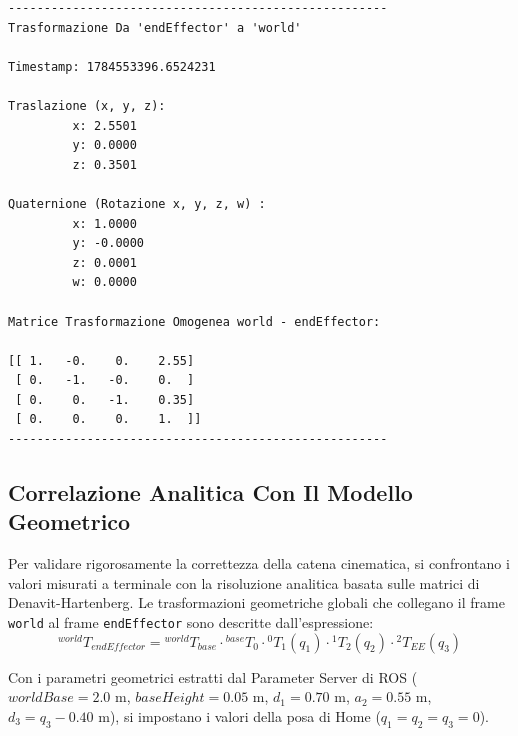 \documentclass[11pt, a4paper]{report}
\begin{document}
\begin{verbatim}
-----------------------------------------------------
Trasformazione Da 'endEffector' a 'world'

Timestamp: 1784553396.6524231

Traslazione (x, y, z):
         x: 2.5501
         y: 0.0000
         z: 0.3501

Quaternione (Rotazione x, y, z, w) :
         x: 1.0000
         y: -0.0000
         z: 0.0001
         w: 0.0000

Matrice Trasformazione Omogenea world - endEffector:

[[ 1.   -0.    0.    2.55]
 [ 0.   -1.   -0.    0.  ]
 [ 0.    0.   -1.    0.35]
 [ 0.    0.    0.    1.  ]]
-----------------------------------------------------
\end{verbatim}

\subsection{Correlazione Analitica Con Il Modello Geometrico}
\label{subsec:discussione_risultati}

Per validare rigorosamente la correttezza della catena cinematica, si confrontano i valori misurati a terminale con la risoluzione analitica basata sulle matrici di Denavit-Hartenberg. Le trasformazioni geometriche globali che collegano il frame \texttt{world} al frame \texttt{endEffector} sono descritte dall'espressione:
\[
    ^{world}T_{endEffector} = {^{world}T_{base}} \cdot {^{base}T_0} \cdot {^{0}T_1}(q_1) \cdot {^{1}T_2}(q_2) \cdot {^{2}T_{EE}}(q_3)
\]

Con i parametri geometrici estratti dal Parameter Server di ROS (\(worldBase = 2.0\) m, \(baseHeight = 0.05\) m, \(d_1 = 0.70\) m, \(a_2 = 0.55\) m, \(d_3 = q_3 - 0.40\) m), si impostano i valori della posa di Home (\(q_1 = q_2 = q_3 = 0\)).
\end{document}
